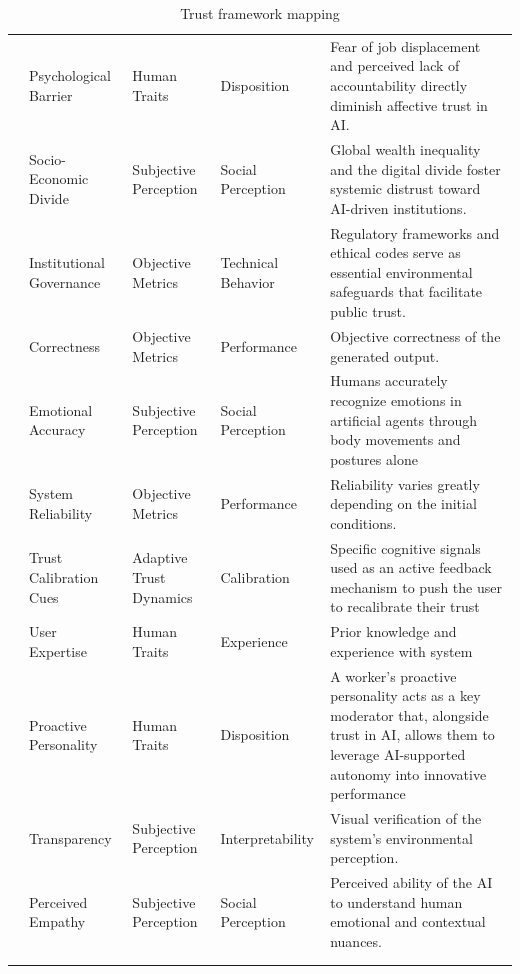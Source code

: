 \begin{longtable}{l l l l p{4cm}}
\cite{wang_2019_artificial_intelligence_future_humanity} & Psychological Barrier & Human Traits & Disposition & Fear of job displacement and perceived lack of accountability directly diminish affective trust in AI. \\
\cite{wang_2019_artificial_intelligence_future_humanity} & Socio-Economic Divide & Subjective Perception & Social Perception & Global wealth inequality and the digital divide foster systemic distrust toward AI-driven institutions. \\
\cite{wang_2019_artificial_intelligence_future_humanity} & Institutional Governance & Objective Metrics & Technical Behavior & Regulatory frameworks and ethical codes serve as essential environmental safeguards that facilitate public trust. \\
\cite{Chong_2022_Human} & Correctness & Objective Metrics & Performance & Objective correctness of the generated output. \\
\cite{Hortensius_2018_emotions} & Emotional Accuracy & Subjective Perception & Social Perception & Humans accurately recognize emotions in artificial agents through body movements  and postures alone \\
\cite{okamura_yamada_2020} & System Reliability & Objective Metrics & Performance & Reliability varies greatly depending on the initial conditions. \\
\cite{okamura_yamada_2020} & Trust Calibration Cues & Adaptive Trust Dynamics & Calibration & Specific cognitive signals used as an active feedback mechanism to push the user to recalibrate their trust \\
\cite{zhang_et_al_2023} & User Expertise & Human Traits & Experience & Prior knowledge and experience with system \\
\cite{Haiyan_Kong_ZihanYin_KayeChon_YueYuan_JinhanYu_2023} & Proactive Personality & Human Traits & Disposition & A worker's proactive personality acts as a key moderator that, alongside trust in AI, allows them to leverage AI-supported autonomy into innovative performance \\
\cite{haeuslschmid_SupportingTrustAutonomousDriving} & Transparency & Subjective Perception & Interpretability & Visual verification of the system's environmental perception. \\
\cite{Tong_artificial_intelligence_feedback} & Perceived Empathy & Subjective Perception & Social Perception & Perceived ability of the AI to understand human emotional and contextual nuances. \\
\bottomrule
\caption{Trust framework mapping}\\
\label{tab:trust_framework}\\
\end{longtable}
\twocolumn
